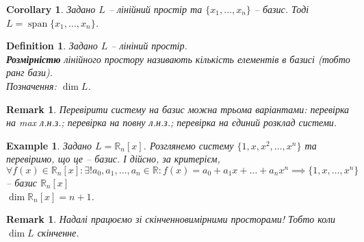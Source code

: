 \documentclass[a4paper, 10pt]{article}
\theoremstyle{theoremdd}
\newtheorem{definition}[theorem]{Definition}
\newtheorem{example}[theorem]{Example}
\newtheorem{remark}[theorem]{Remark}
\newtheorem{corollary}[theorem]{Corollary}
\DeclareMathOperator{\linspan}{span}
\begin{document}
	\begin{corollary}
	Задано $L$ -- лінійний простір та $\{x_1,\dots,x_n\}$ -- базис. Тоді $L = \linspan\{x_1,\dots,x_n\}$.
	\end{corollary}
	
	\begin{definition}
	Задано $L$ -- лініний простір.\\
	\textbf{Розмірністю} лінійного простору називають кількість елементів в базисі (тобто ранг бази).\\
	Позначення: $\dim L$.
	\end{definition}
	
	\begin{remark}
	Перевірити систему на базис можна трьома варіантами: перевірка на max л.н.з.; перевірка на повну л.н.з.; перевірка на єдиний розклад системи.
	\end{remark}
	
	\begin{example}
	Задано $L = \mathbb{R}_n[x]$. Розглянемо систему $\{1, x, x^2, \dots, x^n\}$ та перевіримо, що це -- базис. І дійсно, за критерієм,\\
	$\forall f(x) \in \mathbb{R}_n[x]: \exists! a_0, a_1, \dots, a_n \in \mathbb{R}: f(x) = a_0 + a_1 x + \dots + a_n x^n \implies \{1, x, \dots, x^n\}$ -- базис $\mathbb{R}_n[x]$ \\ $\dim{\mathbb{R}_n[x]} = n+1$.
	\end{example}
	
	\begin{remark}
	Надалі працюємо зі скінченновимірними просторами! Тобто коли $\dim L$ скінченне.
	\end{remark}
	
\end{document}
